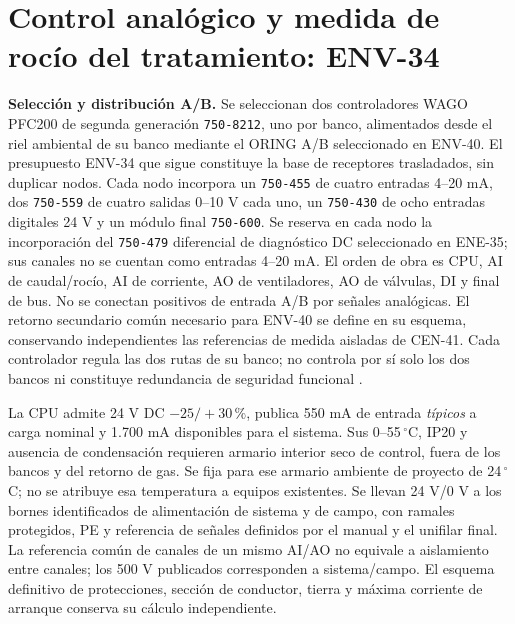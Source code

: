 \section{Control analógico y medida de rocío del tratamiento: ENV-34}
\label{sec:ambiente-env34}
\textbf{Selección y distribución A/B.} Se seleccionan dos controladores WAGO PFC200 de segunda generación \texttt{750-8212}, uno por banco, alimentados desde el riel ambiental de su banco mediante el ORING A/B seleccionado en ENV-40. El presupuesto ENV-34 que sigue constituye la base de receptores trasladados, sin duplicar nodos. Cada nodo incorpora un \texttt{750-455} de cuatro entradas 4--20 mA, dos \texttt{750-559} de cuatro salidas 0--10 V cada uno, un \texttt{750-430} de ocho entradas digitales 24 V y un módulo final \texttt{750-600}. Se reserva en cada nodo la incorporación del \texttt{750-479} diferencial de diagnóstico DC seleccionado en ENE-35; sus canales no se cuentan como entradas 4--20 mA. El orden de obra es CPU, AI de caudal/rocío, AI de corriente, AO de ventiladores, AO de válvulas, DI y final de bus. No se conectan positivos de entrada A/B por señales analógicas. El retorno secundario común necesario para ENV-40 se define en su esquema, conservando independientes las referencias de medida aisladas de CEN-41. Cada controlador regula las dos rutas de su banco; no controla por sí solo los dos bancos ni constituye redundancia de seguridad funcional \parencite[pp.~3--4]{lote34-pfc200}\parencite{lote34-end}.

La CPU admite 24 V DC $-25/+30\,\%$, publica 550 mA de entrada \emph{típicos} a carga nominal y 1.700 mA disponibles para el sistema. Sus 0--55\,$^{\circ}$C, IP20 y ausencia de condensación requieren armario interior seco de control, fuera de los bancos y del retorno de gas. Se fija para ese armario ambiente de proyecto de 24\,$^{\circ}$C; no se atribuye esa temperatura a equipos existentes. Se llevan 24 V/0 V a los bornes identificados de alimentación de sistema y de campo, con ramales protegidos, PE y referencia de señales definidos por el manual y el unifilar final. La referencia común de canales de un mismo AI/AO no equivale a aislamiento entre canales; los 500 V publicados corresponden a sistema/campo. El esquema definitivo de protecciones, sección de conductor, tierra y máxima corriente de arranque conserva su cálculo independiente.


